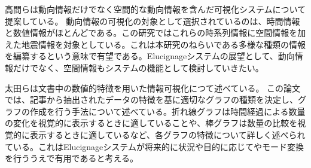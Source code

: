 \documentclass{matsushita-zemi}
\begin{document}
高間らは動向情報だけでなく空間的な動向情報を含んだ可視化システムについて提案している\cite{SpaceTrendInformation}。
動向情報の可視化の対象として選択されているのは、時間情報と数値情報がほとんどである。この研究ではこれらの時系列情報に空間情報を加えた地震情報を対象としている。これは本研究のねらいである多様な種類の情報を編纂するという意味で有望である。Elucignageシステムの展望として、動向情報だけでなく、空間情報もシステムの機能として検討していきたい。


太田らは文書中の数値的特徴を用いた情報可視化につて述べている\cite{numerical_features}。
この論文では、記事から抽出されたデータの特徴を基に適切なグラフの種類を決定し、グラフの作成を行う手法について述べている。折れ線グラフは時間経過による数量の変化を視覚的に表示するときに適していることや、棒グラフは数量の比較を視覚的に表示するときに適しているなど、各グラフの特徴について詳しく述べられている。これはElucignageシステムが将来的に状況や目的に応じてやモード変換を行ううえで有用であると考える。
\end{document}
